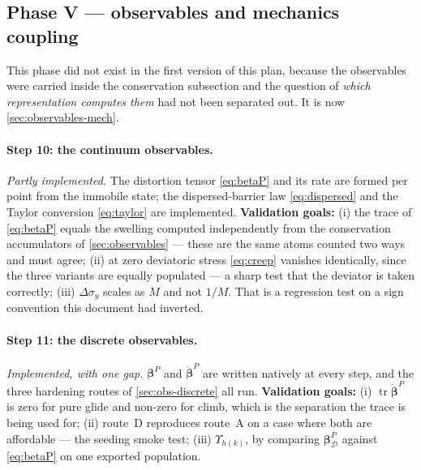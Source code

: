 \documentclass{article}
\begin{document}
\subsection{Phase V --- observables and mechanics coupling}

This phase did not exist in the first version of this plan, because the
observables were carried inside the conservation subsection and the question of
\emph{which representation computes them} had not been separated out. It is now
\cref{sec:observables-mech}.

\paragraph{Step 10: the continuum observables.} \emph{Partly implemented.} The
distortion tensor \cref{eq:betaP} and its rate are formed per point from the
immobile state; the dispersed-barrier law \cref{eq:dispersed} and the Taylor
conversion \cref{eq:taylor} are implemented.
\textbf{Validation goals:} (i) the trace of \cref{eq:betaP} equals the swelling
computed independently from the conservation accumulators of
\cref{sec:observables} --- these are the same atoms counted two ways and must
agree; (ii) at zero deviatoric stress \cref{eq:creep} vanishes identically, since
the three variants are equally populated --- a sharp test that the deviator is
taken correctly; (iii) $\Delta\sigma_y$ scales as $M$ and not $1/M$. That is a
regression test on a sign convention this document had inverted.

\paragraph{Step 11: the discrete observables.} \emph{Implemented, with one gap.}
$\bm\beta^{P}$ and $\dot{\bm\beta}^{P}$ are written natively at every step, and
the three hardening routes of \cref{sec:obs-discrete} all run.
\textbf{Validation goals:} (i) $\operatorname{tr}\dot{\bm\beta}^{P}$ is zero for
pure glide and non-zero for climb, which is the separation the trace is being
used for; (ii) route~D reproduces route~A on a case where both are affordable ---
the seeding smoke test; (iii) $\Upsilon_{h(k)}$, by comparing
$\bm\beta^{P}_{\mathcal D}$ against \cref{eq:betaP} on one exported population.
\end{document}
